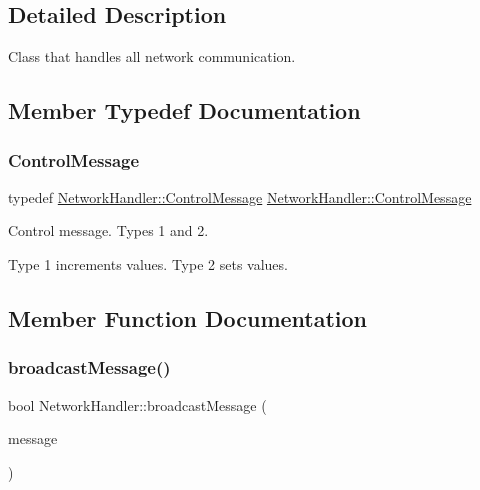\subsection{Detailed Description}
Class that handles all network communication. 

\subsection{Member Typedef Documentation}
\mbox{\label{classNetworkHandler_a29cb429e8069fa3c00b8317aec0b735a}} 
\subsubsection{\texorpdfstring{Control\+Message}{ControlMessage}}
{\footnotesize\ttfamily typedef  \mbox{\hyperlink{structNetworkHandler_1_1ControlMessage}{Network\+Handler\+::\+Control\+Message}}  \mbox{\hyperlink{structNetworkHandler_1_1ControlMessage}{Network\+Handler\+::\+Control\+Message}}}



Control message. Types 1 and 2. 

Type 1 increments values. Type 2 sets values. 

\subsection{Member Function Documentation}
\mbox{\label{classNetworkHandler_a3296b0356692982086aacad3f34b7c12}} 
\subsubsection{\texorpdfstring{broadcast\+Message()}{broadcastMessage()}}
{\footnotesize\ttfamily bool Network\+Handler\+::broadcast\+Message (\begin{DoxyParamCaption}\item[{const \mbox{\hyperlink{structNetworkHandler_1_1BroadcastMessage}{Broadcast\+Message}} $\ast$}]{message }\end{DoxyParamCaption})}



